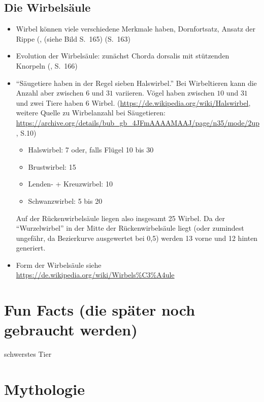 \subsection{Die Wirbelsäule}

\begin{itemize}
 \item Wirbel können viele verschiedene Merkmale haben, \zb Dornfortsatz, Ansatz der Rippe (\cite{Vergleichende_Anatomie}, (siehe Bild S.\ 165) (S.\ 163)
 
 \item Evolution der Wirbelsäule: zunächst Chorda dorsalis mit stützenden Knorpeln (\cite{Vergleichende_Anatomie}, S.\ 166)
 
  \item "`Säugetiere haben in der Regel sieben Halswirbel."' Bei Wirbeltieren kann die Anzahl aber zwischen $6$ und $31$ variieren. Vögel haben zwischen $10$ und $31$ und zwei Tiere haben $6$ Wirbel. (\url{https://de.wikipedia.org/wiki/Halswirbel}, weitere Quelle zu Wirbelanzahl bei Säugetieren: \url{https://archive.org/details/bub_gb_4JFmAAAAMAAJ/page/n35/mode/2up}, S.10)
    \begin{itemize}
     \item Halswirbel: 7 oder, falls Flügel 10 bis 30
     \item Brustwirbel: 15
     \item Lenden- + Kreuzwirbel: 10
     \item Schwanzwirbel: 5 bis 20
    \end{itemize}
 Auf der Rückenwirbelsäule liegen also insgesamt 25 Wirbel.   
 Da der "`Wurzelwirbel"' in der Mitte der Rückenwirbelsäule liegt (oder zumindest ungefähr, da Bezierkurve ausgewertet bei 0,5) werden 13 vorne und 12 hinten generiert.

 \item Form der Wirbelsäule siehe \url{https://de.wikipedia.org/wiki/Wirbels\%C3\%A4ule}
\end{itemize}


\section{Fun Facts (die später noch gebraucht werden)}

\zb schwerstes Tier


\section{Mythologie}

